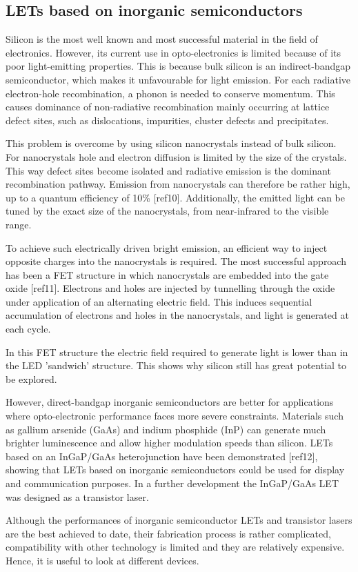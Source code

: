 \subsection{LETs based on inorganic semiconductors} %

Silicon is the most well known and most successful material in the field of electronics. However, its current use in opto-electronics is limited because of its poor light-emitting properties. This is because bulk silicon is an indirect-bandgap semiconductor, which makes it unfavourable for light emission. For each radiative electron-hole recombination, a phonon is needed to conserve momentum. This causes dominance of non-radiative recombination mainly occurring at lattice defect sites, such as dislocations, impurities, cluster defects and precipitates.

This problem is overcome by using silicon nanocrystals instead of bulk silicon. For nanocrystals hole and electron diffusion is limited by the size of the crystals. This way defect sites become isolated and radiative emission is the dominant recombination pathway. Emission from nanocrystals can therefore be rather high, up to a quantum efficiency of  10\% [ref10]. Additionally, the emitted light can be tuned by the exact size of the nanocrystals, from near-infrared to the visible range. 

To achieve such electrically driven bright emission, an efficient way to inject opposite charges into the nanocrystals is required. The most successful approach has been a FET structure in which nanocrystals are embedded into the gate oxide [ref11]. Electrons and holes are injected by tunnelling through the oxide under application of an alternating electric field. This induces sequential accumulation of electrons and holes in the nanocrystals, and light is generated at each cycle.

In this FET structure the electric field required to generate light is lower than in the LED 'sandwich' structure. This shows why silicon still has great potential to be explored.

However, direct-bandgap inorganic semiconductors are better for applications where opto-electronic performance faces more severe constraints. Materials such as gallium arsenide (GaAs) and indium phosphide (InP) can generate much brighter luminescence and allow higher modulation speeds than silicon. LETs based on an InGaP/GaAs heterojunction have been demonstrated [ref12], showing that LETs based on inorganic semiconductors could be used for display and communication purposes. In a further development the InGaP/GaAs LET was designed as a transistor laser.

Although the performances of inorganic semiconductor LETs and transistor lasers are the best achieved to date, their fabrication process is rather complicated, compatibility with other technology is limited and they are relatively expensive. Hence, it is useful to look at different devices.
